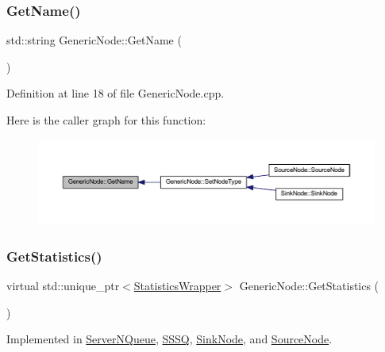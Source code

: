 \subsubsection{\texorpdfstring{Get\+Name()}{GetName()}}
{\footnotesize\ttfamily std\+::string Generic\+Node\+::\+Get\+Name (\begin{DoxyParamCaption}{ }\end{DoxyParamCaption})}



Definition at line 18 of file Generic\+Node.\+cpp.

Here is the caller graph for this function\+:
\nopagebreak
\begin{figure}[H]
\begin{center}
\leavevmode
\includegraphics[width=350pt]{class_generic_node_aaf9d163658172370e01ef5da113b66e0_icgraph}
\end{center}
\end{figure}
\mbox{\label{class_generic_node_ae7c8424c8c14fd3de993c902d78deb67}} 
\subsubsection{\texorpdfstring{Get\+Statistics()}{GetStatistics()}}
{\footnotesize\ttfamily virtual std\+::unique\+\_\+ptr$<$\hyperlink{class_generic_node_1_1_statistics_wrapper}{Statistics\+Wrapper}$>$ Generic\+Node\+::\+Get\+Statistics (\begin{DoxyParamCaption}{ }\end{DoxyParamCaption})\hspace{0.3cm}{\ttfamily [pure virtual]}}



Implemented in \hyperlink{class_server_n_queue_a18718f3796f33fa0f9d9100c34a6a7dc}{Server\+N\+Queue}, \hyperlink{class_s_s_s_q_ad8f307b8a4609d28efcc122dddfe5120}{S\+S\+SQ}, \hyperlink{class_sink_node_ad6aeb0857d3ddd9511cd5d24974e1fac}{Sink\+Node}, and \hyperlink{class_source_node_a0aea882fe808d9da6d506653be166e73}{Source\+Node}.

